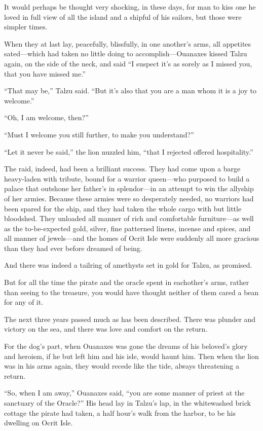 It would perhaps be thought very shocking, in these days, for man to kiss one he loved in full view of all the island and a shipful of his sailors, but those were simpler times.

When they at last lay, peacefully, blissfully, in one another's arms, all appetites sated---which had taken no little doing to accomplish---Ouanaxes kissed Talzu again, on the side of the neck, and said ``I suspect it's as sorely as I missed you, that you have missed me.''

``That may be,'' Talzu said. ``But it's also that you are a man whom it is a joy to welcome.''

``Oh, I am welcome, then?''

``Must I welcome you still further, to make you understand?''

``Let it never be said,'' the lion nuzzled him, ``that I rejected offered hospitality.''

The raid, indeed, had been a brilliant success. They had come upon a barge heavy-laden with tribute, bound for a warrior queen---who purposed to build a palace that outshone her father's in splendor---in an attempt to win the allyship of her armies. Because these armies were so desperately needed, no warriors had been spared for the ship, and they had taken the whole cargo with but little bloodshed. They unloaded all manner of rich and comfortable furniture---as well as the to-be-expected gold, silver, fine patterned linens, incense and spices, and all manner of jewels---and the homes of Ocrit Isle were suddenly all more gracious than they had ever before dreamed of being.

And there was indeed a tailring of amethysts set in gold for Talzu, as promised.

But for all the time the pirate and the oracle spent in eachother's arms, rather than seeing to the treasure, you would have thought neither of them cared a bean for any of it.

\secdiv

\noindent The next three years passed much as has been described. There was plunder and victory on the sea, and there was love and comfort on the return.

For the dog's part, when Ouanaxes was gone the dreams of his beloved's glory and heroism, if he but left him and his isle, would haunt him. Then when the lion was in his arms again, they would recede like the tide, always threatening a return.

``So, when I am away,'' Ouanaxes said, ``you are some manner of priest at the sanctuary of the Oracle?'' His head lay in Talzu's lap, in the whitewashed brick cottage the pirate had taken, a half hour's walk from the harbor, to be his dwelling on Ocrit Isle.

